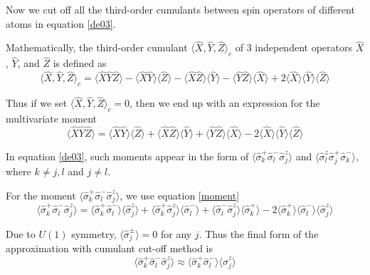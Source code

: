 \documentclass{article}
\begin{document}
Now we cut off all the third-order cumulants between spin operators of different atoms in equation \ref{de03}. 

Mathematically, the third-order cumulant $\langle \hat{X},\hat{Y},\hat{Z} \rangle_c$ of 3 independent operators $\hat{X}$, $\hat{Y}$, and $\hat{Z}$ is defined as
\begin{equation}
    \langle \hat{X},\hat{Y},\hat{Z}\rangle_c = \langle \hat{X} \hat{Y} \hat{Z} \rangle-\langle \hat{X} \hat{Y} \rangle \langle \hat{Z}\rangle-\langle \hat{X} \hat{Z} \rangle \langle \hat{Y}\rangle-\langle \hat{Y} \hat{Z} \rangle \langle \hat{X}\rangle
    +2\langle \hat{X} \rangle \langle \hat{Y}\rangle \langle  \hat{Z} \rangle
\end{equation}

Thus if we set $\langle \hat{X},\hat{Y},\hat{Z}\rangle_c=0$, then we end up with an expression for the multivariate moment
\begin{equation}
\label{moment}
    \langle \hat{X} \hat{Y} \hat{Z} \rangle=\langle \hat{X} \hat{Y} \rangle \langle \hat{Z}\rangle+\langle \hat{X} \hat{Z} \rangle \langle \hat{Y}\rangle+\langle \hat{Y} \hat{Z} \rangle \langle \hat{X}\rangle
    -2\langle \hat{X} \rangle \langle \hat{Y}\rangle \langle  \hat{Z} \rangle
\end{equation}

In equation \ref{de03}, such moments appear in the form of $\langle \hat{\sigma}_k^+\hat{\sigma}_l^-\hat{\sigma}_j^z\rangle$ and $\langle \hat{\sigma}^z_l\hat{\sigma}^+_j\hat{\sigma}_k^-\rangle$, where $k\neq j, l$ and $j\neq l$.

For the moment $\langle \hat{\sigma}_k^+\hat{\sigma}_l^-\hat{\sigma}_j^z\rangle$, we use equation \ref{moment}
\begin{equation}
    \langle \hat{\sigma}_k^+\hat{\sigma}_l^-\hat{\sigma}_j^z\rangle = \langle \hat{\sigma}_k^+ \hat{\sigma}_l^- \rangle \langle \hat{\sigma}_j^z\rangle+\langle \hat{\sigma}_k^+ \hat{\sigma}_j^z \rangle \langle \hat{\sigma}_l^-\rangle+\langle\hat{\sigma}_l^-\hat{\sigma}_j^z \rangle \langle \hat{\sigma}_k^+\rangle
    -2\langle \hat{\sigma}_k^+ \rangle \langle \hat{\sigma}_l^-\rangle \langle  \hat{\sigma}_j^z \rangle
\end{equation}

Due to $U(1)$ symmetry, $\langle\hat{\sigma}^\pm_j\rangle=0$ for any $j$. Thus the final form of the approximation with cumulant cut-off method is
\begin{equation}
    \langle \hat{\sigma}_k^+\hat{\sigma}_l^-\hat{\sigma}_j^z\rangle \approx \langle \hat{\sigma}_k^+ \hat{\sigma}_l^- \rangle \langle \hat{\sigma}_j^z\rangle
\end{equation}
\end{document}
